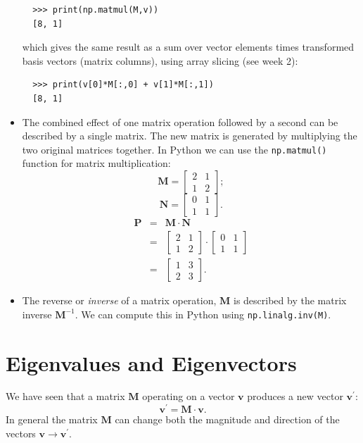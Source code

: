 \documentclass[a4paper]{article}
\newcommand{\bvec}[1]{\boldsymbol{\mathbf{#1}}}
\begin{document}
\begin{itemize}
  \begin{lstlisting}
  >>> print(np.matmul(M,v))
  [8, 1]
  \end{lstlisting}
  which gives the same result as a sum over vector elements times transformed basis vectors (matrix columns), using array slicing (see week 2):
  \begin{lstlisting}
  >>> print(v[0]*M[:,0] + v[1]*M[:,1])
  [8, 1]
  \end{lstlisting}
  \item The combined effect of one matrix operation followed by a second can be described by a single matrix. The new matrix is generated by multiplying the two original matrices together. In Python we can use the \texttt{np.matmul()} function for matrix multiplication:
  \begin{equation*}
  \bvec{M}  =  \begin{bmatrix}2&1\\1&2\end{bmatrix};
  \end{equation*}
  \begin{equation*}
  \bvec{N}  =  \begin{bmatrix}0&1\\1&1\end{bmatrix}.
  \end{equation*}
  \begin{eqnarray*}
  \bvec{P}& = & \bvec{M}\cdot\bvec{N} \\
          & = & \begin{bmatrix}2&1\\1&2\end{bmatrix}\cdot\begin{bmatrix}0&1\\1&1\end{bmatrix} \\
          & = & \begin{bmatrix}1&3\\2&3\end{bmatrix}.
  \end{eqnarray*}
  \item The reverse or \emph{inverse} of a matrix operation, $\bvec{M}$ is described by the matrix inverse $\bvec{M}^{-1}$. We can compute this in Python using \texttt{np.linalg.inv(M)}.
\end{itemize}
\pagebreak
\section{Eigenvalues and Eigenvectors}
We have seen that a matrix $\bvec{M}$ operating on a vector $\bvec{v}$ produces a new vector $\bvec{v^\prime}$:
\begin{equation*}
\bvec{v}^\prime = \bvec{M}\cdot\bvec{v}.
\end{equation*}
In general the matrix $\bvec{M}$ can change both the magnitude and direction of the vectors $\bvec{v}\to\bvec{v^\prime}$. 
\end{document}
